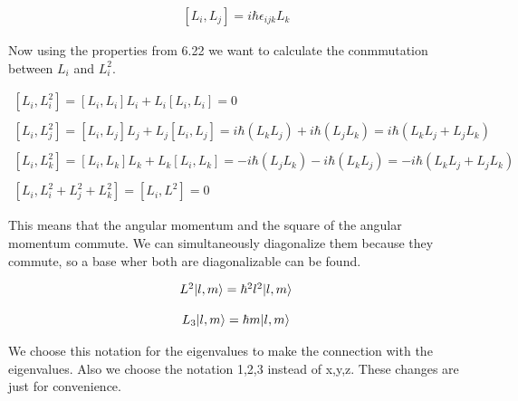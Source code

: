 
\begin{equation}
  \begin{array}{c}
    \label{9.6}
    [L_i,L_j] = i\hbar \epsilon_{ijk} L_k
  \end{array}
\end{equation}

Now using the properties from 6.22 we want to calculate the conmmutation between $L_i$ and $L_i^2$.

\begin{equation}
  \begin{array}{c}
    [L_i,L_i^2] = [L_i,L_i]L_i + L_i[L_i,L_i] = 0
    \\

    \\
    \left[ L_i,L_j^2 \right] = \left[L_i,L_j\right]L_j + L_j[L_i,L_j] = i \hbar \left(L_k L_j \right) + i \hbar \left( L_j L_k \right) = i \hbar (L_k L_j + L_j L_k)
    \\

    \\
    \left[L_i,L_k^2\right] = [L_i,L_k]L_k + L_k[L_i,L_k] = -i\hbar\left(L_j L_k\right)-i\hbar\left(L_k L_j\right) = -i\hbar(L_k L_j + L_j L_k)
    \\

    \\
    \left[L_i,L_i^2 +L_j^2+L_k^2\right] = [L_i, L^2] = 0
  \end{array}
\end{equation}

This means that the angular momentum and the square of the angular momentum commute. We can simultaneously diagonalize them because they commute, so a base wher both are diagonalizable can be found.

\begin{equation}
  \label{9.8}
  \begin{array}{c}
    L^2 \lvert l,m\rangle = \hbar^2 l^2 \lvert l,m\rangle
    \\

    \\
    L_3 \lvert l,m\rangle = \hbar m \lvert l,m\rangle
  \end{array}
\end{equation}

We choose this notation for the eigenvalues to make the connection with the eigenvalues. Also we choose the notation 1,2,3 instead of x,y,z. These changes are just for convenience.

